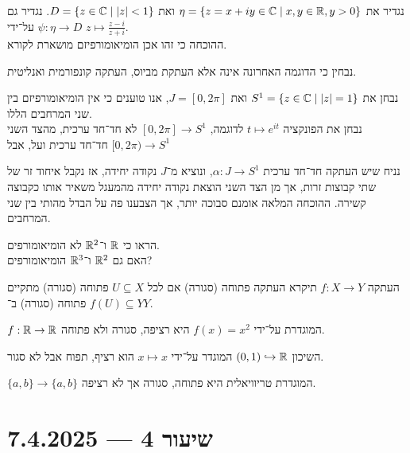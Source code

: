 \begin{example}
	נגדיר את $\eta = \{ z = x + iy \in \mathbb{C} \mid x, y \in \mathbb{R}, y > 0 \}$ ואת $D = \{ z \in \mathbb{C} \mid |z| < 1 \}$.
	נגדיר גם $\psi : \eta \to D$ על־ידי $z \mapsto \frac{z - i}{z + i}$. \\
	ההוכחה כי זהו אכן הומיאומורפיזם מושארת לקורא.
\end{example}
נבחין כי הדוגמה האחרונה אינה אלא העתקת מביוס, העתקה קונפורמית ואנליטית.
\begin{example}
	נבחן את $S^1 = \{ z \in \mathbb{C} \mid |z| = 1 \}$ ואת $J = [0, 2\pi]$, אנו טוענים כי אין הומיאומורפיזם בין שני המרחבים הללו. \\
	נבחן את הפונקציה $t \mapsto e^{it}$ לדוגמה,
	$[0, 2\pi] \to S^1$ לא חד־חד ערכית, מהצד השני $[0, 2\pi) \to S^1$ חד־חד ערכית ועל, אבל 

	נניח שיש העתקה חד־חד ערכית $\alpha : J \to S^1$, ונוציא מ־$J$ נקודה יחידה, אז נקבל איחוד זר של שתי קבוצות זרות, אך מן הצד השני הוצאת נקודה יחידה מהמעגל משאיר אותו כקבוצה קשירה.
	ההוכחה המלאה אומנם סבוכה יותר, אך הצבענו פה על הבדל מהותי בין שני המרחבים.
\end{example}
\begin{exercise}
	הראו כי $\mathbb{R}$ ו־$\mathbb{R}^2$ לא הומיאומורפים. \\
	האם גם $\mathbb{R}^2$ ו־$\mathbb{R}^3$ הומיאומורפים?
\end{exercise}
\begin{definition}
	העתקה $f : X \to Y$ תיקרא העתקה פתוחה (סגורה) אם לכל $U \subseteq X$ פתוחה (סגורה) מתקיים $f(U) \subseteq Y$ פתוחה (סגורה) ב־$Y$.
\end{definition}
\begin{example}
	$f : \mathbb{R} \to \mathbb{R}$ המוגדרת על־ידי $f(x) = x^2$ היא רציפה, סגורה ולא פתוחה.
\end{example}
\begin{example}
	השיכון $(0, 1) \hookrightarrow \mathbb{R}$ המוגדר על־ידי $x \mapsto x$ הוא רציף, תפוח אבל לא סגור.
\end{example}
\begin{example}
	$\{ a, b \} \to \{ a, b \}$ המוגדרת טריוויאלית היא פתוחה, סגורה אך לא רציפה.
\end{example}

\section{שיעור 4 --- 7.4.2025}
